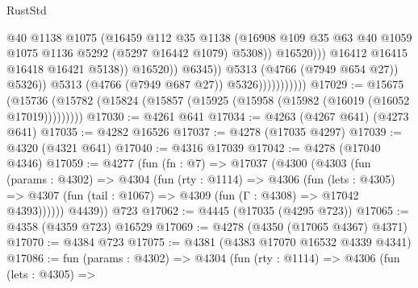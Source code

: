 \begin{lexlean}{RustStd}
\begin{coremodule}
                                                @40
                                                @1138
                                                @1075
                                                (@16459
                                                  @112
                                                  @35
                                                  @1138
                                                  (@16908
                                                    @109
                                                    @35
                                                    @63
                                                    @40
                                                    @1059
                                                    @1075
                                                    @1136
                                                    @5292
                                                    (@5297 @16442 @1079)
                                                    @5308))
                                                @16520)))
                                          @16412
                                          @16415
                                          @16418
                                          @16421
                                          @5138))
                                      @16520))
                                  @6345))
                              @5313
                              (@4766 (@7949 @654 @27))
                              @5326))
                          @5313
                          (@4766 (@7949 @687 @27))
                          @5326)))))))))))
@17029 := @15675
    (@15736 (@15782 (@15824 (@15857 (@15925 (@15958 (@15982 (@16019 (@16052 @17019)))))))))
@17030 := @4261 @641
@17034 := @4263 (@4267 @641) (@4273 @641)
@17035 := @4282 @16526
@17037 := @4278 (@17035 @4297)
@17039 := @4320 (@4321 @641)
@17040 := @4316 @17039
@17042 := @4278 (@17040 @4346)
@17059 := @4277
    (fun (fn : @7) =>
    @17037
      (@4300
        (@4303
          (fun (params : @4302) =>
          @4304
            (fun (rty : @1114) =>
            @4306
              (fun (lets : @4305) =>
              @4307 (fun (tail : @1067) => @4309 (fun (Γ : @4308) => @17042 @4393))))))
        @4439))
    @723
@17062 := @4445 (@17035 (@4295 @723))
@17065 := @4358 (@4359 @723) @16529
@17069 := @4278 (@4350 (@17065 @4367) @4371)
@17070 := @4384 @723
@17075 := @4381 (@4383 @17070 @16532 @4339 @4341)
@17086 := fun (params : @4302) =>
  @4304
    (fun (rty : @1114) =>
    @4306
      (fun (lets : @4305) =>

\end{coremodule}
\end{lexlean}
